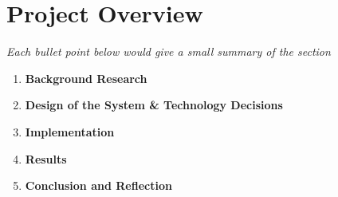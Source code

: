 \section{Project Overview} \label{sec:intro:overview} 
\textit{Each bullet point below would give a small summary of the section}
\begin{enumerate}
    \item \textbf{Background Research} 
    \item \textbf{Design of the System \& Technology Decisions}
    \item \textbf{Implementation}
    \item \textbf{Results}
    \item \textbf{Conclusion and Reflection}
\end{enumerate}
